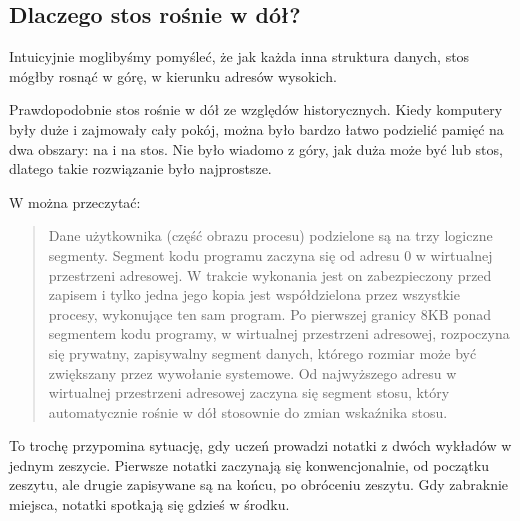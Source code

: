 \subsection{Dlaczego stos rośnie w dół?}
\label{stack_grow_backwards}

Intuicyjnie moglibyśmy pomyśleć, że jak każda inna struktura danych, stos mógłby rosnąć w górę, w kierunku adresów wysokich.

Prawdopodobnie stos rośnie w dół ze względów historycznych.
Kiedy komputery były duże i zajmowały cały pokój, można było bardzo łatwo podzielić pamięć na dwa obszary: na  i na stos.
Nie było wiadomo z góry, jak duża może być  lub stos, dlatego takie rozwiązanie było najprostsze.



W \RitchieThompsonUNIX można przeczytać:

\begin{framed}
\begin{quotation}
Dane użytkownika (część obrazu procesu) podzielone są na trzy logiczne segmenty.
Segment kodu programu zaczyna się od adresu 0 w wirtualnej przestrzeni adresowej.
W trakcie wykonania jest on zabezpieczony przed zapisem i tylko jedna jego kopia jest współdzielona przez wszystkie procesy, wykonujące ten sam program.
Po pierwszej granicy 8KB ponad segmentem kodu programy, w wirtualnej przestrzeni adresowej, rozpoczyna się prywatny, zapisywalny segment danych, którego rozmiar może być zwiększany przez wywołanie systemowe.
Od najwyższego adresu w wirtualnej przestrzeni adresowej zaczyna się segment stosu, który automatycznie rośnie w dół stosownie do zmian wskaźnika stosu.
\end{quotation}
\end{framed}

To trochę przypomina sytuację, gdy uczeń prowadzi notatki z dwóch wykładów w jednym zeszycie. Pierwsze notatki zaczynają się konwencjonalnie, od początku zeszytu, ale drugie zapisywane są na końcu, po obróceniu zeszytu. Gdy zabraknie miejsca, notatki spotkają się gdzieś w środku.


